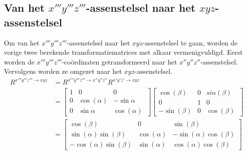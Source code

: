 \subsection{Van het $x'''y'''z'''$-assenstelsel naar het $xyz$-assenstelsel}
Om van het $x'''y'''z'''$-assenstelsel naar het $xyz$-assenstelsel te gaan, worden de vorige twee berekende transformatiematrices met alkaar vermenigvuldigd. Eerst worden de $x'''y'''z'''$-co\"ordinaten getransformeerd naar het $x''y''z''$-assenstelsel. Vervolgens worden ze omgezet naar het $xyz$-assenstelsel.
\begin{equation*}
\begin{split}
R^{x'''y'''z''' \rightarrow xyz} & =R^{x'''y'''z''' \rightarrow x''y''z''}R^{x'y'z' \rightarrow xyz} \\
&=
  \begin{bmatrix}
      1 & 0 & 0\\
      0 & \cos(\alpha) & -\sin{\alpha}\\ 
      0 & \sin{\alpha} & \cos(\alpha)\
      \end{bmatrix}
  \begin{bmatrix}
      \cos(\beta) & 0 & sin(\beta)\\
      0 & 1 & 0\\ 
      -\sin(\beta) & 0 & \cos(\beta)\
      \end{bmatrix} \\
&=
  \begin{bmatrix}
      \cos(\beta) & 0 & \sin(\beta)\\
      \sin(\alpha)\sin(\beta) & \cos(\alpha) & -\sin(\alpha)\cos(\beta)\\
      -\cos(\alpha)\sin(\beta) & \sin(\alpha) & \cos(\alpha)\cos(\beta)\  
      \end{bmatrix}
\end{split}
\end{equation*}